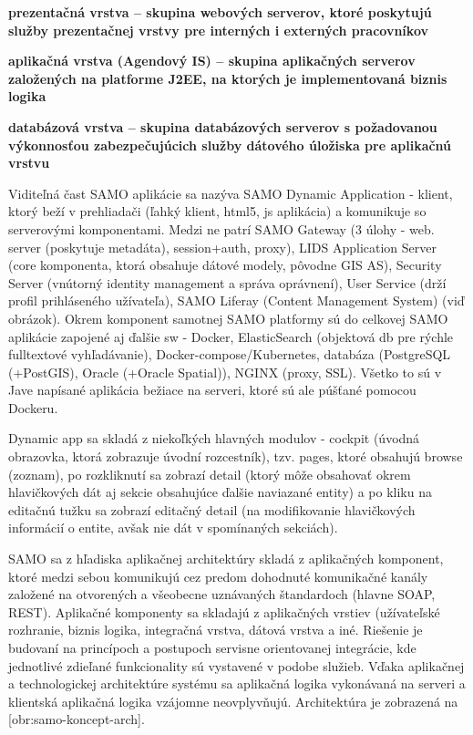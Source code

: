 \startitemize
\item \start\bf prezentačná vrstva \stop -- skupina webových serverov, ktoré poskytujú služby prezentačnej vrstvy pre interných i externých pracovníkov
\item \start\bf aplikačná vrstva \stop (Agendový IS) -- skupina aplikačných serverov založených na platforme J2EE, na ktorých je implementovaná biznis logika
\item  \start\bf databázová vrstva \stop -- skupina databázových serverov s požadovanou výkonnosťou zabezpečujúcich služby dátového úložiska pre aplikačnú vrstvu
\stopitemize

Viditeľná čast SAMO aplikácie sa nazýva SAMO Dynamic Application - klient, ktorý beží v prehliadači (ľahký klient, html5, js aplikácia) a komunikuje so serverovými komponentami. Medzi ne patrí SAMO Gateway (3 úlohy - web. server (poskytuje metadáta), session+auth, proxy), LIDS Application Server (core komponenta, ktorá obsahuje dátové modely, pôvodne GIS AS), Security Server (vnútorný identity management a správa oprávnení), User Service (drží profil prihláseného užívateľa), SAMO Liferay (Content Management System) (viď obrázok). Okrem komponent samotnej SAMO platformy sú do celkovej SAMO aplikácie zapojené aj ďalšie sw - Docker, ElasticSearch (objektová db pre rýchle fulltextové vyhľadávanie), Docker-compose/Kubernetes, databáza (PostgreSQL (+PostGIS), Oracle (+Oracle Spatial)), NGINX (proxy, SSL). Všetko to sú v Jave napísané aplikácia bežiace na serveri, ktoré sú ale púšťané pomocou Dockeru.

Dynamic app sa skladá z niekoľkých hlavných modulov - cockpit (úvodná obrazovka, ktorá zobrazuje úvodní rozcestník), tzv. pages, ktoré obsahujú browse (zoznam), po rozkliknutí sa zobrazí detail (ktorý môže obsahovať okrem hlavičkových dát aj sekcie obsahujúce ďalšie naviazané entity) a po kliku na editačnú tužku sa zobrazí editačný detail (na modifikovanie hlavičkových informácií o entite, avšak nie dát v spomínaných sekciách).

SAMO sa z hľadiska aplikačnej architektúry skladá z aplikačných komponent, ktoré medzi sebou komunikujú cez predom dohodnuté komunikačné kanály založené na otvorených a všeobecne uznávaných štandardoch (hlavne SOAP, REST). Aplikačné komponenty sa skladajú z aplikačných vrstiev (užívateľské rozhranie, biznis logika, integračná vrstva, dátová vrstva a iné. Riešenie je budovaní na princípoch a postupoch servisne orientovanej integrácie, kde jednotlivé zdieľané funkcionality sú vystavené v podobe služieb. Vďaka aplikačnej a technologickej architektúre systému sa aplikačná logika vykonávaná na serveri a klientská aplikačná logika vzájomne neovplyvňujú. Architektúra je zobrazená na [obr:samo-koncept-arch].

